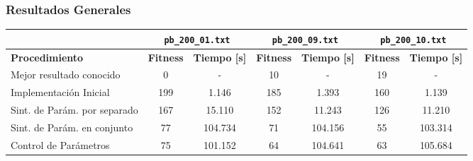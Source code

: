 \frame
{
\frametitle{Resultados Generales}
\begin{center}

\tiny{
\begin{tabular}{|l|c|c|c|c|c|c|}
\hline
                            & \multicolumn{2}{|c|}{\texttt{pb\_200\_01.txt}} & \multicolumn{2}{|c|}{\texttt{pb\_200\_09.txt}} & \multicolumn{2}{|c|}{\texttt{pb\_200\_10.txt}} \\ \hline
\textbf{Procedimiento}      & \textbf{Fitness} & \textbf{Tiempo [s]} & \textbf{Fitness} & \textbf{Tiempo [s]} & \textbf{Fitness} & \textbf{Tiempo [s]} \\\hline
Mejor resultado conocido    & 0                & -                   &  10              &       -             &     19           &      -              \\\hline
Implementación Inicial      & 199              & 1.146               &  185             &       1.393         &     160          &  1.139              \\\hline
Sint. de Parám. por separado &  167& 15.110              &  152             &       11.243        &     126          &  11.210             \\\hline
Sint. de Parám. en conjunto &   77 & 104.734             &  71              &       104.156       &     55           &  103.314            \\\hline
Control de Parámetros       & 75               & 101.152             &  64              &       104.641       &     63           &  105.684            \\\hline
\end{tabular}
}
\end{center}

}

